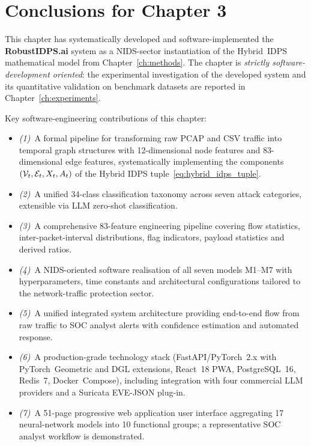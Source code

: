 \section{Conclusions for Chapter 3}
\label{sec:ch3_summary}

This chapter has systematically developed and software-implemented
the \textbf{RobustIDPS.ai} system as a NIDS-sector instantiation of
the Hybrid~IDPS mathematical model from
Chapter~\ref{ch:methods}. The chapter is \emph{strictly software-development
oriented}: the experimental investigation of the developed system
and its quantitative validation on benchmark datasets are reported
in Chapter~\ref{ch:experiments}.

Key software-engineering contributions of this chapter:
\begin{itemize}\setlength\itemsep{2pt}
\item \emph{(1)}~A formal pipeline for transforming raw PCAP and
CSV traffic into temporal graph structures with 12-dimensional
node features and 83-dimensional edge features, systematically
implementing the components $(\mathcal{V}_t, \mathcal{E}_t, X_t, A_t)$ of the
Hybrid IDPS tuple~\eqref{eq:hybrid_idps_tuple}.
\item \emph{(2)}~A unified 34-class classification taxonomy across
seven attack categories, extensible via LLM zero-shot classification.
\item \emph{(3)}~A comprehensive 83-feature engineering pipeline
covering flow statistics, inter-packet-interval distributions, flag
indicators, payload statistics and derived ratios.
\item \emph{(4)}~A NIDS-oriented software realisation of all seven
models M1--M7 with hyperparameters, time constants and architectural
configurations tailored to the network-traffic protection sector.
\item \emph{(5)}~A unified integrated system architecture providing
end-to-end flow from raw traffic to SOC analyst alerts with
confidence estimation and automated response.
\item \emph{(6)}~A production-grade technology stack
(FastAPI/PyTorch~2.x with PyTorch~Geometric and DGL extensions,
React~18 PWA, PostgreSQL~16, Redis~7, Docker~Compose), including
integration with four commercial LLM providers and a Suricata
EVE-JSON plug-in.
\item \emph{(7)}~A 51-page progressive web application user
interface aggregating 17 neural-network models into 10 functional
groups; a representative SOC analyst workflow is demonstrated.
\end{itemize}

